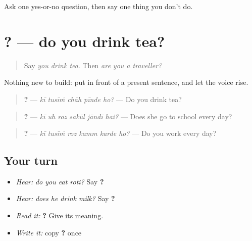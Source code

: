 \begin{tcolorbox}[breakable,colback=teal!4,colframe=teal!35!black,title={Before you move on}]
Ask one yes-or-no question, then say one thing you don't do.
\end{tcolorbox}
\section[\texorpdfstring{\pa{ਕੀ} \pa{ਤੁਸੀਂ} \pa{ਚਾਹ} \pa{ਪੀਂਦੇ} \pa{ਹੋ}? (kī tusīṁ chāh …)}{ਕੀ ਤੁਸੀਂ ਚਾਹ ਪੀਂਦੇ ਹੋ? (kī tusīṁ chāh …)}]{    ? — do you drink tea?}

\label{lesson:PA-C215-ki-pinde}



\begin{quote}
Say \emph{you drink tea}. Then \emph{are you a traveller?}
\end{quote}

\begin{grammarlens}[title={Grammar Lens: \pa{ਕੀ} and the every-day present}]
Nothing new to build: put \textbf{} in front of a present sentence, and let the voice rise.

\begin{quote}
\textbf{    ?} — \emph{kī tusīṁ chāh pīnde ho?} — Do you drink tea?
\end{quote}

\begin{quote}
\textbf{     ?} — \emph{kī uh roz sakūl jāndī hai?} — Does she go to school every day?
\end{quote}

\begin{quote}
\textbf{     ?} — \emph{kī tusīṁ roz kamm karde ho?} — Do you work every day?
\end{quote}
\end{grammarlens}

\subsection*{Your turn}
\begin{itemize}
\raggedright
  \item \emph{Hear:} \emph{do you eat roti?} Say \textbf{    ?}
  \item \emph{Hear:} \emph{does he drink milk?} Say \textbf{    ?}
  \item \emph{Read it:} \textbf{    ?} Give its meaning.
  \item \emph{Write it:} copy \textbf{    ?} once
\end{itemize}

